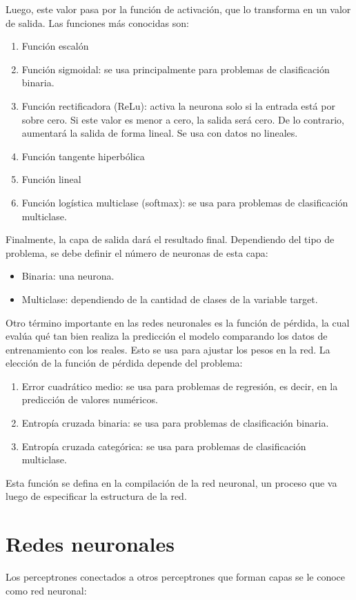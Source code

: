 \documentclass[a4paper, 12pt]{book}
\begin{document}
Luego, este valor pasa por la función de activación, que lo transforma en un valor de salida. Las funciones más conocidas son:
\begin{enumerate}
	\item Función escalón
	\item Función sigmoidal: se usa principalmente para problemas de clasificación binaria.
	\item Función rectificadora (ReLu): activa la neurona solo si la entrada está por sobre cero. Si este valor es menor a cero, la salida será cero. De lo contrario, aumentará la salida de forma lineal. Se usa con datos no lineales.
	\item Función tangente hiperbólica
	\item Función lineal
	\item Función logística multiclase (softmax): se usa para problemas de clasificación multiclase.
\end{enumerate}

Finalmente, la capa de salida dará el resultado final. Dependiendo del tipo de problema, se debe definir el número de neuronas de esta capa:
\begin{itemize}
	\item Binaria: una neurona.
	\item Multiclase: dependiendo de la cantidad de clases de la variable target.
\end{itemize}

Otro término importante en las redes neuronales es la función de pérdida, la cual evalúa qué tan bien realiza la predicción el modelo comparando los datos de entrenamiento con los reales. Esto se usa para ajustar los pesos en la red. La elección de la función de pérdida depende del problema:
\begin{enumerate}
	\item Error cuadrático medio: se usa para problemas de regresión, es decir, en la predicción de valores numéricos.
	\item Entropía cruzada binaria: se usa para problemas de clasificación binaria.
	\item Entropía cruzada categórica: se usa para problemas de clasificación multiclase.
\end{enumerate}
Esta función se defina en la compilación de la red neuronal, un proceso que va luego de especificar la estructura de la red.
\section{Redes neuronales}
Los perceptrones conectados a otros perceptrones que forman capas se le conoce como red neuronal:
\end{document}
